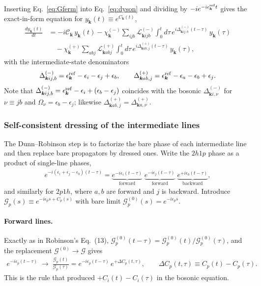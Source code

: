 Inserting Eq.~\eqref{eq:Gferm} into Eq.~\eqref{eq:dyson} and dividing by $-i e^{-i\epsilon^{\rm ref}_{\bm{k}}t}$ gives the exact-in-form equation for $y_{\bm{k}}(t)\equiv e^{C_{\bm{k}}(t)}$,
\begin{align}
\frac{dy_{\bm{k}}(t)}{dt}
&=
-i\mathcal{C}_{\bm{k}}\,y_{\bm{k}}(t)
-\chi^{(-)}_{\bm{k}}\sum_{ijb}\mathcal{L}^{(-)}_{\bm{k}ijb}
\int_0^t d\tau\,e^{i\Delta^{(-)}_{\bm{k}ij,b}(t-\tau)}\,y_{\bm{k}}(\tau)
\nonumber\\
&\quad
-\chi^{(+)}_{\bm{k}}\sum_{abj}\mathcal{L}^{(+)}_{\bm{k}abj}
\int_0^t d\tau\,e^{i\Delta^{(+)}_{\bm{k}ab,j}(t-\tau)}\,y_{\bm{k}}(\tau),
\label{eq:ybare}
\end{align}
with the intermediate-state denominators
\begin{align}
\Delta^{(-)}_{\bm{k}ij,b}
=\epsilon^{\rm ref}_{\bm{k}}-\epsilon_i-\epsilon_j+\epsilon_b,
\qquad
\Delta^{(+)}_{\bm{k}ab,j}
=\epsilon^{\rm ref}_{\bm{k}}-\epsilon_a-\epsilon_b+\epsilon_j.
\label{eq:Deltas}
\end{align}
Note that $\Delta^{(-)}_{\bm{k}ij,b}=\epsilon^{\rm ref}_{\bm{k}}-\epsilon_i+(\epsilon_b-\epsilon_j)$ coincides with the bosonic $\Delta^{(-)}_{\bm{k}i,\nu}$ for $\nu\equiv jb$ and $\Omega_\nu=\epsilon_b-\epsilon_j$; likewise $\Delta^{(+)}_{\bm{k}ab,j}=\Delta^{(+)}_{\bm{k}a,\nu}$.

\subsubsection{Self-consistent dressing of the intermediate lines}
The Dunn--Robinson step is to factorize the bare phase of each intermediate line and then replace bare propagators by dressed ones. Write the $2h1p$ phase as a product of single-line phases,
\begin{align}
e^{-i(\epsilon_i+\epsilon_j-\epsilon_b)(t-\tau)}
=
\underbrace{e^{-i\epsilon_i(t-\tau)}}_{\text{forward}}\;
\underbrace{e^{-i\epsilon_j(t-\tau)}}_{\text{forward}}\;
\underbrace{e^{+i\epsilon_b(t-\tau)}}_{\text{backward}},
\end{align}
and similarly for $2p1h$, where $a,b$ are forward and $j$ is backward. Introduce $\mathcal{G}_p(s)\equiv e^{-i\epsilon_p s+C_p(s)}$ with bare limit $\mathcal{G}^{(0)}_p(s)=e^{-i\epsilon_p s}$.

\paragraph{Forward lines.}
Exactly as in Robinson's Eq.~(13), $\mathcal{G}^{(0)}_p(t-\tau)=\mathcal{G}^{(0)}_p(t)/\mathcal{G}^{(0)}_p(\tau)$, and the replacement $\mathcal{G}^{(0)}\to\mathcal{G}$ gives
\begin{align}
e^{-i\epsilon_p(t-\tau)}
\;\longrightarrow\;
\frac{\mathcal{G}_p(t)}{\mathcal{G}_p(\tau)}
=
e^{-i\epsilon_p(t-\tau)}\,e^{+\Delta C_p(t,\tau)},
\qquad
\Delta C_p(t,\tau)\equiv C_p(t)-C_p(\tau).
\end{align}
This is the rule that produced $+C_i(t)-C_i(\tau)$ in the bosonic equation.

